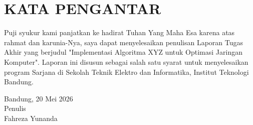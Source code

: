 \chapter*{KATA PENGANTAR}

Puji syukur kami panjatkan ke hadirat Tuhan Yang Maha Esa karena atas rahmat dan karunia-Nya, saya dapat menyelesaikan penulisan Laporan Tugas Akhir yang berjudul "Implementasi Algoritma XYZ untuk Optimasi Jaringan Komputer". Laporan ini disusun sebagai salah satu syarat untuk menyelesaikan program Sarjana di Sekolah Teknik Elektro dan Informatika, Institut Teknologi Bandung.
\begin{flushright}
    Bandung, 20 Mei 2026\\
    
    Penulis \\
    \vspace{1cm}
    Fahreza Yunanda
\end{flushright}
